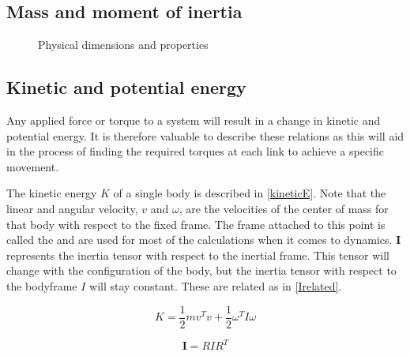 \subsection{Mass and moment of inertia}

\begin{figure}[h!]    
    \centering           
    \def\svgwidth{\columnwidth}
    
    \caption{Physical dimensions and properties}
    \label{physical}
\end{figure}

\subsection{Kinetic and potential energy}


Any applied force or torque to a system will result in a change in kinetic and potential energy. It is therefore valuable to describe these relations as this will aid in the process of finding the required torques at each link to achieve a specific movement.

The kinetic energy $K$ of a single body is described in \eqref{kineticE}. Note that the linear and angular velocity, $v$ and $\omega$, are the velocities of the center of mass for that body with respect to the fixed frame. The frame attached to this point is called the  and are used for most of the calculations when it comes to dynamics. $\mathbf{I}$ represents the inertia tensor with respect to the inertial frame.  This tensor will change with the configuration of the body, but the inertia tensor with respect to the \gls{bodyframe} $I$ will stay constant. These are related as in \eqref{Irelated}.

\begin{equation}\label{kineticE}
K = \frac{1}{2}mv^Tv + \frac{1}{2}\omega ^{T}  I \omega
\end{equation}

\begin{equation}\label{Irelated}
\mathbf{I} = RIR^T
\end{equation}

